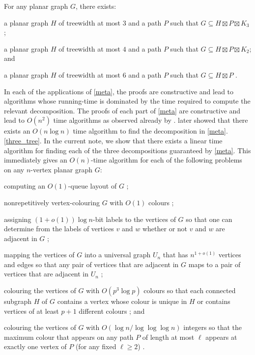 \documentclass{patmorin}
\begin{document}
\begin{thm}\label{meta}
  For any planar graph $G$, there exists:
  \begin{compactenum}[(a)]
    \item \label{three_tree} a planar graph $H$ of treewidth at most $3$ and a path $P$ such that $G\subseteq H\boxtimes P\boxtimes K_3$ \cite{dujmovic.joret.ea:planar};
    \item \label{four_tree} a planar graph $H$ of treewidth at most $4$ and a path $P$ such that $G\subseteq H\boxtimes P\boxtimes K_2$; and
    \item \label{six_tree} a planar graph $H$ of treewidth at most $6$ and a path $P$ such that $G\subseteq H\boxtimes P$ \cite{ueckerdt.wood.ea:improved}.
  \end{compactenum}
\end{thm}

In each of the applications of \cref{meta}, the proofs are constructive and lead to algorithms whose running-time is dominated by the time required to compute the relevant decomposition.  The proofs of each part of \cref{meta} are constructive and lead to $O(n^2)$ time algorithms as observed already by \citet{dujmovic.joret.ea:planar}.  \citet{morin:fast} later showed that there exists an $O(n\log n)$ time algorithm to find the decomposition in \cref{meta}.\ref{three_tree}.  In the current note, we show that there exists a linear time algorithm for finding each of the three decompositions guaranteed by \cref{meta}.  This immediately gives an $O(n)$-time algorithm for each of the following problems on any $n$-vertex planar graph $G$:
\begin{compactitem}
  \item computing an $O(1)$-queue layout of $G$ \cite{dujmovic.joret.ea:planar};
  \item nonrepetitively vertex-colouring $G$ with $O(1)$ colours \cite{dujmovic.esperet.ea:planar};
  \item assigning $(1+o(1))\log n$-bit labels to the vertices of $G$ so that one can determine from the labels of vertices $v$ and $w$ whether or not $v$ and $w$ are adjacent in $G$ \cite{dujmovic.esperet.ea:adjacency};
  \item mapping the vertices of $G$ into a universal graph $U_n$ that has $n^{1+o(1)}$ vertices and edges so that any pair of vertices that are adjacent in $G$ maps to a pair of vertices that are adjacent in $U_n$ \cite{esperet.joret.ea:sparse};
  \item colouring the vertices of $G$ with $O(p^3\log p)$ colours so that each connected subgraph $H$ of $G$ contains a vertex whose colour is unique in $H$ or contains vertices of at least $p+1$ different colours \cite{debski.felsner.ea:improved}; and
  \item colouring the vertices of $G$ with $O(\log n/\log\log\log n)$ integers so that the maximum colour that appears on any path $P$ of length at most $\ell$ appears at exactly one vertex of $P$ (for any fixed $\ell\ge 2$) \cite{bose.dujmovic.ea:asymptotically}.
\end{compactitem}
\end{document}

